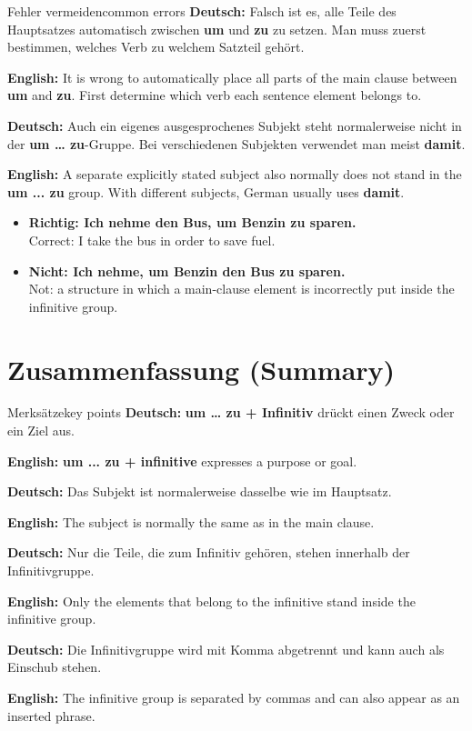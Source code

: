 \documentclass[a4paper,11pt]{article}
\newcommand{\GermanText}[1]{\textbf{Deutsch: }#1\par}
\newcommand{\EnglishText}[1]{{\small\color{SoftGray}\textbf{English: }#1\par}}
\newcommand{\ExampleItem}[2]{\item \textbf{#1}\\{\small\color{SoftGray}#2}}
\begin{document}
        \begin{grammarentry}{Fehler vermeiden}{common errors}
            \GermanText{Falsch ist es, alle Teile des Hauptsatzes automatisch zwischen \textbf{um} und \textbf{zu} zu setzen. Man muss zuerst bestimmen, welches Verb zu welchem Satzteil gehört.}
            \EnglishText{It is wrong to automatically place all parts of the main clause between \textbf{um} and \textbf{zu}. First determine which verb each sentence element belongs to.}

            \GermanText{Auch ein eigenes ausgesprochenes Subjekt steht normalerweise nicht in der \textbf{um \ldots{} zu}-Gruppe. Bei verschiedenen Subjekten verwendet man meist \textbf{damit}.}
            \EnglishText{A separate explicitly stated subject also normally does not stand in the \textbf{um ... zu} group. With different subjects, German usually uses \textbf{damit}.}
        \end{grammarentry}

        \begin{exbox}
            \begin{itemize}
                \ExampleItem{Richtig: Ich nehme den Bus, um Benzin zu sparen.}{Correct: I take the bus in order to save fuel.}
                \ExampleItem{Nicht: Ich nehme, um Benzin den Bus zu sparen.}{Not: a structure in which a main-clause element is incorrectly put inside the infinitive group.}
            \end{itemize}
        \end{exbox}


    \section{Zusammenfassung \textnormal{(Summary)}}

        \begin{grammarentry}{Merksätze}{key points}
            \GermanText{\textbf{um \ldots{} zu + Infinitiv} drückt einen Zweck oder ein Ziel aus.}
            \EnglishText{\textbf{um ... zu + infinitive} expresses a purpose or goal.}

            \GermanText{Das Subjekt ist normalerweise dasselbe wie im Hauptsatz.}
            \EnglishText{The subject is normally the same as in the main clause.}

            \GermanText{Nur die Teile, die zum Infinitiv gehören, stehen innerhalb der Infinitivgruppe.}
            \EnglishText{Only the elements that belong to the infinitive stand inside the infinitive group.}

            \GermanText{Die Infinitivgruppe wird mit Komma abgetrennt und kann auch als Einschub stehen.}
            \EnglishText{The infinitive group is separated by commas and can also appear as an inserted phrase.}
        \end{grammarentry}
\end{document}
